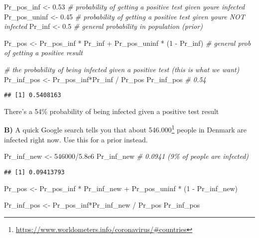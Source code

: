 \documentclass[
]{article}
\newenvironment{Shaded}{\begin{snugshade}}{\end{snugshade}}
\newcommand{\CommentTok}[1]{\textcolor[rgb]{0.56,0.35,0.01}{\textit{#1}}}
\newcommand{\DecValTok}[1]{\textcolor[rgb]{0.00,0.00,0.81}{#1}}
\newcommand{\FloatTok}[1]{\textcolor[rgb]{0.00,0.00,0.81}{#1}}
\newcommand{\NormalTok}[1]{#1}
\newcommand{\OtherTok}[1]{\textcolor[rgb]{0.56,0.35,0.01}{#1}}
\newcommand{\SpecialCharTok}[1]{\textcolor[rgb]{0.00,0.00,0.00}{#1}}
\begin{document}
\begin{Shaded}
\begin{Highlighting}[]
\NormalTok{Pr\_pos\_inf }\OtherTok{\textless{}{-}} \FloatTok{0.53} \CommentTok{\# probability of getting a positive test given you\textquotesingle{}re infected}
\NormalTok{Pr\_pos\_uninf }\OtherTok{\textless{}{-}} \FloatTok{0.45} \CommentTok{\# probability of getting a positive test given you\textquotesingle{}re NOT infected}
\NormalTok{Pr\_inf }\OtherTok{\textless{}{-}} \FloatTok{0.5} \CommentTok{\# general probability in population (prior)}

\NormalTok{Pr\_pos }\OtherTok{\textless{}{-}}\NormalTok{ Pr\_pos\_inf }\SpecialCharTok{*}\NormalTok{ Pr\_inf }\SpecialCharTok{+}\NormalTok{ Pr\_pos\_uninf }\SpecialCharTok{*}\NormalTok{ (}\DecValTok{1} \SpecialCharTok{{-}}\NormalTok{ Pr\_inf) }\CommentTok{\# general prob of getting a positive result}

\CommentTok{\# the probability of being infected given a positive test (this is what we want)}
\NormalTok{Pr\_inf\_pos }\OtherTok{\textless{}{-}}\NormalTok{ Pr\_pos\_inf}\SpecialCharTok{*}\NormalTok{Pr\_inf }\SpecialCharTok{/}\NormalTok{ Pr\_pos }
\NormalTok{Pr\_inf\_pos }\CommentTok{\# 0.54}
\end{Highlighting}
\end{Shaded}

\begin{verbatim}
## [1] 0.5408163
\end{verbatim}

There's a 54\% probability of being infected given a positive test
result

\textbf{B)} A quick Google search tells you that about
546.000\footnote{\url{https://www.worldometers.info/coronavirus/\#countries}}
people in Denmark are infected right now. Use this for a prior instead.

\begin{Shaded}
\begin{Highlighting}[]
\NormalTok{Pr\_inf\_new }\OtherTok{\textless{}{-}} \DecValTok{546000}\SpecialCharTok{/}\FloatTok{5.8e6}
\NormalTok{Pr\_inf\_new }\CommentTok{\# 0.0941 (9\% of people are infected)}
\end{Highlighting}
\end{Shaded}

\begin{verbatim}
## [1] 0.09413793
\end{verbatim}

\begin{Shaded}
\begin{Highlighting}[]
\NormalTok{Pr\_pos }\OtherTok{\textless{}{-}}\NormalTok{ Pr\_pos\_inf }\SpecialCharTok{*}\NormalTok{ Pr\_inf\_new }\SpecialCharTok{+}\NormalTok{ Pr\_pos\_uninf }\SpecialCharTok{*}\NormalTok{ (}\DecValTok{1} \SpecialCharTok{{-}}\NormalTok{ Pr\_inf\_new)}

\NormalTok{Pr\_inf\_pos }\OtherTok{\textless{}{-}}\NormalTok{ Pr\_pos\_inf}\SpecialCharTok{*}\NormalTok{Pr\_inf\_new }\SpecialCharTok{/}\NormalTok{ Pr\_pos}
\NormalTok{Pr\_inf\_pos}
\end{Highlighting}
\end{Shaded}
\end{document}
